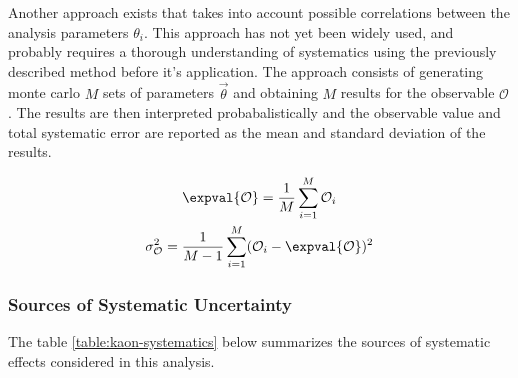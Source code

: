 Another approach exists that takes into account possible correlations between the analysis parameters $\theta_i$.  This approach has not yet been widely used, and probably requires a thorough understanding of systematics using the previously described method before it's application.  The approach consists of generating monte carlo $M$ sets of parameters $\vec{\theta}$ and obtaining $M$ results for the observable $\mathcal{O}$.  The results are then interpreted probabalistically and the observable value and total systematic error are reported as the mean and standard deviation of the results.

\begin{gather}
  \expval{\mathcal{O}} = \frac{1}{M} \sum_{i=1}^{M} \mathcal{O}_i \\
  \sigma_{\mathcal{O}}^{2} = \frac{1}{M-1} \sum_{i=1}^{M} (\mathcal{O}_i - \expval{\mathcal{O}})^2
\end{gather}

\subsubsection*{Sources of Systematic Uncertainty}
The table \ref{table:kaon-systematics} below summarizes the sources of systematic effects considered in this analysis.

